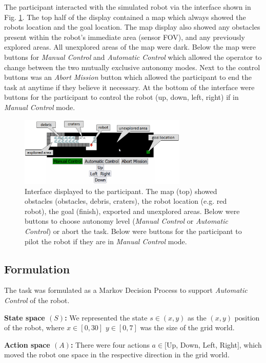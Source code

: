 \documentclass[aaai]{article}
\begin{document}
The participant interacted with the simulated robot via the interface shown in Fig. \ref{fig:INTERFACE}. The top half of the display contained a map which always showed the robots location and the goal location. The map display also showed any obstacles present within the robot's immediate area (sensor FOV), and any previously explored areas. All unexplored areas of the map were dark. Below the map were buttons for \textit{Manual Control} and \textit{Automatic Control} which allowed the operator to change between the two mutually exclusive autonomy modes. Next to the control buttons was an \textit{Abort Mission} button which allowed the participant to end the task at anytime if they believe it necessary. At the bottom of the interface were buttons for the participant to control the robot (up, down, left, right) if in \textit{Manual Control} mode.

\begin{figure}[htbp]
\centering
\includegraphics[width=8cm]{images/interface.png}
\caption{Interface displayed to the participant. The map (top) showed obstacles (obstacles, debris, craters),
the robot location (e.g. red robot), the goal (finish), exported and unexplored areas. Below were buttons
to choose autonomy level (\textit{Manual Control} or \textit{Automatic Control}) or abort the task.
Below were buttons for the participant to pilot the robot if they are in \textit{Manual Control} mode.}
\label{fig:INTERFACE}
\end{figure}

\subsection{Formulation} The task was formulated as a Markov Decision Process to support \textit{Automatic Control} of the robot.

\textbf{State space $(S)$:} We represented the state $s \in (x,y)$ as the $(x, y)$ position of the robot, where $x \in [0,30]$ $y \in [0,7]$ was the size of the grid world.

\textbf{Action space $(A)$:} There were four actions $a \in [$Up, Down, Left, Right$]$, which moved the robot one space in the respective direction in the grid world.
\end{document}
